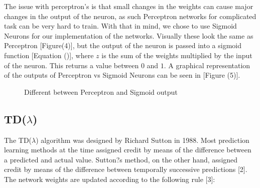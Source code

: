\documentclass{sig-alternate-05-2015}
\begin{document}
	
	The issue with perceptron's is that small changes in the weights can cause major changes in the output of the neuron, as such Perceptron networks for complicated task can be very hard to train. With that in mind, we chose to use Sigmoid Neurons for our implementation of the networks. Visually these look the same as Perceptron [Figure(4)], but the output of the neuron is passed into a sigmoid function [Equation ()], where $z$ is the sum of the weights multiplied by the input of the neuron. This returns a value between $0$ and $1$. A graphical representation of the outputs of Perceptron vs Sigmoid Neurons can be seen in [Figure (5)].
	
\begin{figure}[h!]
\centering
{}
\caption{Different between Perceptron and Sigmoid output}
\label{fig:graph5}
\end{figure}
	
\subsection{TD(\(\lambda\))}

	The TD(\(\lambda\)) algorithm was designed by Richard Sutton in 1988. Most prediction learning methods at the time assigned credit by means of the difference between a predicted and actual value. Sutton?s method, on the other hand, assigned credit by means of the difference between temporally successive predictions [2]. The network weights are updated according to the following rule [3]:
	
\end{document}
